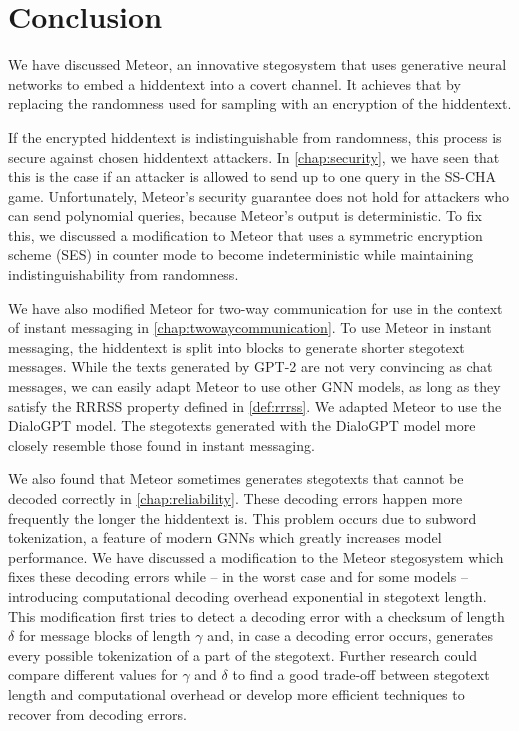 \chapter{Conclusion}
\label{chap:conclusion}

We have discussed Meteor, an innovative stegosystem that uses generative neural networks to embed a hiddentext into a covert channel.
It achieves that by replacing the randomness used for sampling with an encryption of the hiddentext.

If the encrypted hiddentext is indistinguishable from randomness, this process is secure against chosen hiddentext attackers.
In \autoref{chap:security}, we have seen that this is the case if an attacker is allowed to send up to one query in the SS-CHA game.
Unfortunately, Meteor's security guarantee does not hold for attackers who can send polynomial queries, because Meteor's output is deterministic.
To fix this, we discussed a modification to Meteor that uses a symmetric encryption scheme (SES) in counter mode to become indeterministic while maintaining indistinguishability from randomness.

We have also modified Meteor for two-way communication for use in the context of instant messaging in \autoref{chap:twowaycommunication}.
To use Meteor in instant messaging, the hiddentext is split into blocks to generate shorter stegotext messages.
While the texts generated by GPT-2 are not very convincing as chat messages, we can easily adapt Meteor to use other GNN models, as long as they satisfy the RRRSS property defined in \autoref{def:rrrss}.
We adapted Meteor to use the DialoGPT model.
The stegotexts generated with the DialoGPT model more closely resemble those found in instant messaging.

We also found that Meteor sometimes generates stegotexts that cannot be decoded correctly in \autoref{chap:reliability}.
These decoding errors happen more frequently the longer the hiddentext is.
This problem occurs due to subword tokenization, a feature of modern GNNs which greatly increases model performance.
We have discussed a modification to the Meteor stegosystem which fixes these decoding errors while -- in the worst case and for some models -- introducing computational decoding overhead exponential in stegotext length.
This modification first tries to detect a decoding error with a checksum of length $\delta$ for message blocks of length $\gamma$ and, in case a decoding error occurs, generates every possible tokenization of a part of the stegotext.
Further research could compare different values for $\gamma$ and $\delta$ to find a good trade-off between stegotext length and computational overhead or develop more efficient techniques to recover from decoding errors.

